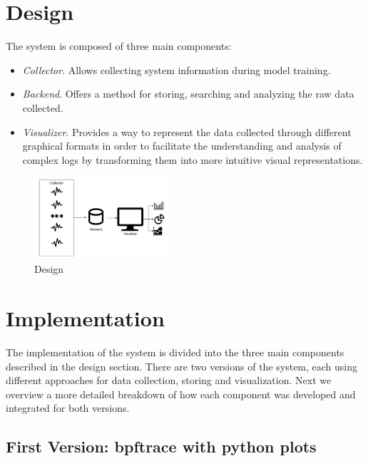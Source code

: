 \documentclass[conference]{IEEEtran}
\begin{document}
\section{Design}
The system is composed of three main components:
\begin{itemize}
	\item \textit{Collector}. Allows collecting system information during model training.
	\item \textit{Backend}. Offers a method for storing, searching and analyzing the raw data collected.
	\item \textit{Visualizer}. Provides a way to represent the data collected through different graphical formats in order to facilitate the understanding and analysis of complex logs by transforming them into more intuitive visual representations.
\end{itemize}


\begin{figure}[htbp]
    \centering
	\includegraphics[width=0.45\textwidth]{images/DesignPIV2.pdf}
    \caption{Design}
    \label{fig:Design}
\end{figure}

\section{Implementation}
The implementation of the system is divided into the three main components described in the design section.
There are two versions of the system, each using different approaches for data collection, storing and visualization.
Next we overview a more detailed breakdown of how each component was developed and integrated for both versions.

\subsection{First Version: bpftrace with python plots} %
\end{document}

